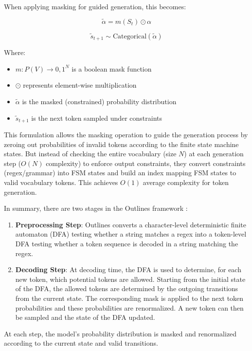When applying masking for guided generation, this becomes:

\[\tilde{\alpha} = m(S_t) \odot \alpha\]

\[\tilde{s}_{t+1} \sim \text{Categorical}(\tilde{\alpha})\]

Where:

\begin{itemize}
    \item $m: P(V) \rightarrow {0,1}^N$ is a boolean mask function
    \item $\odot$ represents element-wise multiplication
    \item $\tilde{\alpha}$ is the masked (constrained) probability distribution
    \item $\tilde{s}_{t+1}$ is the next token sampled under constraints
\end{itemize}
This formulation allows the masking operation to guide the generation process by zeroing out probabilities of invalid tokens according to the finite state machine states. But instead of checking the entire vocabulary (size $N$) at each generation step ($O(N)$ complexity) to enforce output constraints, they convert constraints (regex/grammar) into FSM states and build an index mapping FSM states to valid vocabulary tokens. This achieves $O(1)$ average complexity for token generation.

In summary, there are two stages in the Outlines framework \cite{vivien2024regex}:

\begin{enumerate}
    \item \textbf{Preprocessing Step}: Outlines converts a character-level deterministic finite automaton (DFA) testing whether a string matches a regex into a token-level DFA testing whether a token sequence is decoded in a string matching the regex.

    \item \textbf{Decoding Step}: At decoding time, the DFA is used to determine, for each new token, which potential tokens are allowed. Starting from the initial state of the DFA, the allowed tokens are determined by the outgoing transitions from the current state. The corresponding mask is applied to the next token probabilities and these probabilities are renormalized. A new token can then be sampled and the state of the DFA updated.
\end{enumerate}

At each step, the model's probability distribution is masked and renormalized according to the current state and valid transitions.

